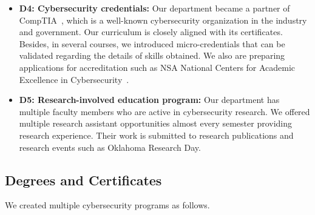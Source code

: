 \documentclass{article}
\begin{document}
\begin{itemize}
\item \textbf{D4: Cybersecurity credentials:}
Our department became a partner of CompTIA~\cite{comptia}, which is a well-known cybersecurity organization in the industry and government. Our curriculum is closely aligned with its certificates.
Besides, in several courses, we introduced
micro-credentials that can be validated regarding the details of skills obtained.
We also are preparing applications for accreditation such as NSA National Centers for Academic Excellence in Cybersecurity~\cite{cae}.

\item \textbf{D5: Research-involved education program:} Our department has multiple faculty members who are active in cybersecurity research. We offered multiple research assistant opportunities almost every semester providing research experience. Their work is submitted to research publications and research events such as Oklahoma Research Day.

\end{itemize}


\subsection{Degrees and Certificates}

We created multiple cybersecurity programs as follows.
\end{document}
